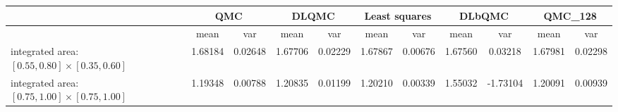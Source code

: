 \begin{tabular}{|l|c|c|c|c|c|c|c|c|c|c|}
\hline
 &\multicolumn{2}{c|}{\textbf{QMC}}&\multicolumn{2}{c|}{\textbf{DLQMC}}&\multicolumn{2}{c|}{\textbf{Least squares}}&\multicolumn{2}{c|}{\textbf{DLbQMC}}&\multicolumn{2}{c|}{\textbf{QMC\_128}}\\ 
\hline

 &mean&var&mean&var&mean&var&mean&var&mean&var\\ 
\hline
integrated area: $[0.55,0.80]\times [0.35,0.60]$ &1.68184&0.02648&1.67706&0.02229&1.67867&0.00676&1.67560&0.03218&1.67981&0.02298\\ 
\hline
integrated area: $[0.75,1.00]\times [0.75,1.00]$ &1.19348&0.00788&1.20835&0.01199&1.20210&0.00339&1.55032&-1.73104&1.20091&0.00939\\ 
\hline
\end{tabular}

